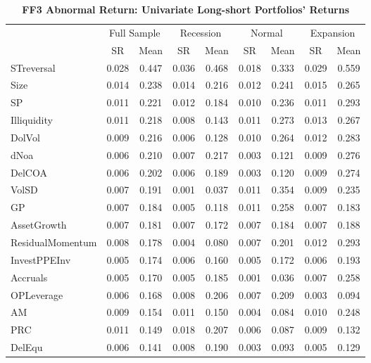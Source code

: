 \begin{table}[H]
  \centering
  \footnotesize
  \caption{\textbf{FF3 Abnormal Return: Univariate Long-short Portfolios' Returns}}
  \label{table: ff3 univariate ls portfolio}
  \begin{tabular}{lcc|cc|cc|cc}
  \hline
      ~ & \multicolumn{2}{c}{Full Sample} & \multicolumn{2}{c}{Recession} & \multicolumn{2}{c}{Normal} & \multicolumn{2}{c}{Expansion} \\
      ~ & SR & Mean & SR & Mean & SR & Mean & SR & Mean \\ \hline
      STreversal & 0.028 & 0.447 & 0.036 & 0.468 & 0.018 & 0.333 & 0.029 & 0.559 \\ 
      Size & 0.014 & 0.238 & 0.014 & 0.216 & 0.012 & 0.241 & 0.015 & 0.265 \\ 
      SP & 0.011 & 0.221 & 0.012 & 0.184 & 0.010 & 0.236 & 0.011 & 0.293 \\ 
      Illiquidity & 0.011 & 0.218 & 0.008 & 0.143 & 0.011 & 0.273 & 0.013 & 0.267 \\ 
      DolVol & 0.009 & 0.216 & 0.006 & 0.128 & 0.010 & 0.264 & 0.012 & 0.283 \\ 
      dNoa & 0.006 & 0.210 & 0.007 & 0.217 & 0.003 & 0.121 & 0.009 & 0.276 \\ 
      DelCOA & 0.006 & 0.202 & 0.006 & 0.189 & 0.003 & 0.120 & 0.009 & 0.274 \\ 
      VolSD & 0.007 & 0.191 & 0.001 & 0.037 & 0.011 & 0.354 & 0.009 & 0.235 \\ 
      GP & 0.007 & 0.184 & 0.005 & 0.118 & 0.011 & 0.258 & 0.007 & 0.183 \\ 
      AssetGrowth & 0.007 & 0.181 & 0.007 & 0.172 & 0.007 & 0.184 & 0.007 & 0.188 \\ 
      ResidualMomentum & 0.008 & 0.178 & 0.004 & 0.080 & 0.007 & 0.201 & 0.012 & 0.293 \\ 
      InvestPPEInv & 0.005 & 0.174 & 0.006 & 0.160 & 0.005 & 0.172 & 0.006 & 0.193 \\ 
      Accruals & 0.005 & 0.170 & 0.005 & 0.185 & 0.001 & 0.036 & 0.007 & 0.258 \\ 
      OPLeverage & 0.006 & 0.168 & 0.008 & 0.206 & 0.007 & 0.209 & 0.003 & 0.094 \\ 
      AM & 0.009 & 0.154 & 0.011 & 0.150 & 0.004 & 0.084 & 0.010 & 0.248 \\ 
      PRC & 0.011 & 0.149 & 0.018 & 0.207 & 0.006 & 0.087 & 0.009 & 0.132 \\ 
      DelEqu & 0.006 & 0.141 & 0.008 & 0.190 & 0.003 & 0.093 & 0.005 & 0.129 \\ 

\end{tabular}
\end{table}
